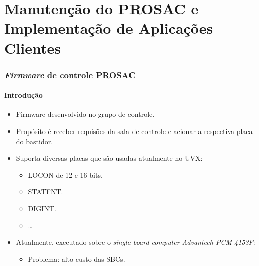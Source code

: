 
\section {Manutenção do PROSAC e Implementação de Aplicações Clientes}

\begin{frame}
\frametitle {\textit{Firmware} de controle PROSAC}
\framesubtitle{Introdução}

\begin{itemize}
  \item Firmware desenvolvido no grupo de controle.
  \item Propósito é receber requisões da sala de controle e acionar a respectiva placa do bastidor. 
  \item Suporta diversas placas que são usadas atualmente no UVX:
  \begin{itemize}
    \item LOCON de 12 e 16 bits.
    \item STATFNT.
    \item DIGINT.
    \item \ldots
   \end{itemize}
   \item Atualmente, executado sobre o \textit{single-board computer Advantech
   PCM-4153F}:
   \begin{itemize} 
   		\item Problema: alto custo das SBCs.
   \end{itemize} 
\end{itemize}

\end{frame}


